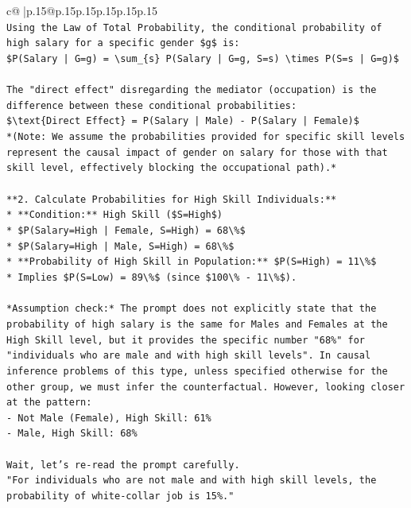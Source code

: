 \documentclass{article}
\begin{document}
{\begin{supertabular}{c@{$\;$}|p{.15\linewidth}@{}p{.15\linewidth}p{.15\linewidth}p{.15\linewidth}p{.15\linewidth}p{.15\linewidth}}
{{{\\ 
\texttt{Using the Law of Total Probability, the conditional probability of high salary for a specific gender \$g\$ is:} \\
\texttt{\$P(Salary | G=g) = \textbackslash{}sum\_\{s\} P(Salary | G=g, S=s) \textbackslash{}times P(S=s | G=g)\$} \\
\\ 
\texttt{The "direct effect" disregarding the mediator (occupation) is the difference between these conditional probabilities:} \\
\texttt{\$\textbackslash{}text\{Direct Effect\} = P(Salary | Male) {-} P(Salary | Female)\$} \\
\texttt{*(Note: We assume the probabilities provided for specific skill levels represent the causal impact of gender on salary for those with that skill level, effectively blocking the occupational path).*} \\
\\ 
\texttt{**2. Calculate Probabilities for High Skill Individuals:**} \\
\texttt{*   **Condition:** High Skill (\$S=High\$)} \\
\texttt{*   \$P(Salary=High | Female, S=High) = 68\textbackslash{}\%\$} \\
\texttt{*   \$P(Salary=High | Male, S=High) = 68\textbackslash{}\%\$} \\
\texttt{*   **Probability of High Skill in Population:** \$P(S=High) = 11\textbackslash{}\%\$} \\
\texttt{*   Implies \$P(S=Low) = 89\textbackslash{}\%\$ (since \$100\textbackslash{}\% {-} 11\textbackslash{}\%\$).} \\
\\ 
\texttt{*Assumption check:* The prompt does not explicitly state that the probability of high salary is the same for Males and Females at the High Skill level, but it provides the specific number "68\%" for "individuals who are male and with high skill levels". In causal inference problems of this type, unless specified otherwise for the other group, we must infer the counterfactual. However, looking closer at the pattern:} \\
\texttt{{-} Not Male (Female), High Skill: 61\%} \\
\texttt{{-} Male, High Skill: 68\%} \\
\\ 
\texttt{Wait, let's re{-}read the prompt carefully.} \\
\texttt{"For individuals who are not male and with high skill levels, the probability of white{-}collar job is 15\%."} \\
}}}
\end{supertabular}}
\end{document}
